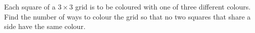 Each square of a $3\times3$ grid is to be coloured with one of three different colours. Find the number of ways to colour the grid so that no two squares that share a side have the same colour.
